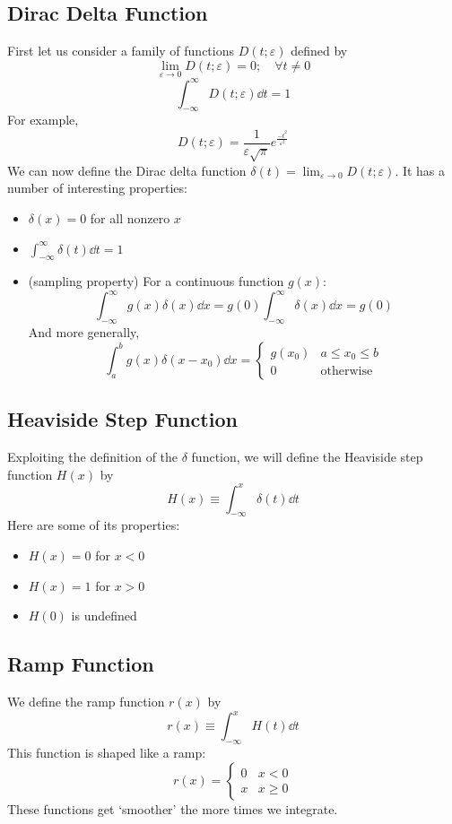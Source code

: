 \subsection{Dirac Delta Function}
First let us consider a family of functions \(D(t; \varepsilon)\) defined by
\[
	\lim_{\varepsilon \to 0} D(t; \varepsilon) = 0;\quad\forall t \neq 0
\]
\[
	\int_{-\infty}^\infty D(t;\varepsilon) \dd{t} = 1
\]
For example,
\[
	D(t; \varepsilon) = \frac{1}{\varepsilon\sqrt{\pi}}e^{\frac{-t^2}{\varepsilon^2}}
\]
We can now define the Dirac delta function \(\delta(t) = \lim_{\varepsilon \to 0} D(t; \varepsilon)\).
It has a number of interesting properties:
\begin{itemize}
	\item \(\delta(x) = 0\) for all nonzero \(x\)
	\item \(\int_{-\infty}^\infty \delta(t) \dd{t} = 1\)
	\item (sampling property) For a continuous function \(g(x)\):
	      \[
		      \int_{-\infty}^\infty g(x)\delta(x) \dd{x} = g(0)\int_{-\infty}^\infty \delta(x) \dd{x} = g(0)
	      \]
	      And more generally,
	      \[
		      \int_a^b g(x)\delta(x-x_0) \dd{x} = \begin{cases}
			      g(x_0) & a \leq x_0 \leq b \\
			      0      & \text{otherwise}
		      \end{cases}
	      \]
\end{itemize}

\subsection{Heaviside Step Function}
Exploiting the definition of the \(\delta\) function, we will define the Heaviside step function \(H(x)\) by
\[
	H(x) \equiv \int_{-\infty}^x \delta(t) \dd{t}
\]
Here are some of its properties:
\begin{itemize}
	\item \(H(x) = 0\) for \(x < 0\)
	\item \(H(x) = 1\) for \(x > 0\)
	\item \(H(0)\) is undefined
\end{itemize}

\subsection{Ramp Function}
We define the ramp function \(r(x)\) by
\[
	r(x) \equiv \int_{-\infty}^x H(t) \dd{t}
\]
This function is shaped like a ramp:
\[
	r(x) = \begin{cases}
		0 & x < 0    \\
		x & x \geq 0
	\end{cases}
\]
These functions get `smoother' the more times we integrate.

